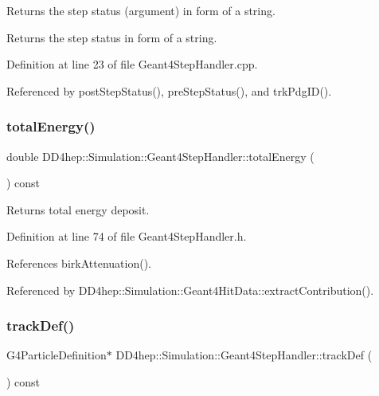 Returns the step status (argument) in form of a string. 

Returns the step status in form of a string. 

Definition at line 23 of file Geant4\+Step\+Handler.\+cpp.



Referenced by post\+Step\+Status(), pre\+Step\+Status(), and trk\+Pdg\+I\+D().

\hypertarget{class_d_d4hep_1_1_simulation_1_1_geant4_step_handler_a1945532b5c538c979b75f598dd1f54d0}{}\label{class_d_d4hep_1_1_simulation_1_1_geant4_step_handler_a1945532b5c538c979b75f598dd1f54d0} 
\subsubsection{\texorpdfstring{total\+Energy()}{totalEnergy()}}
{\footnotesize\ttfamily double D\+D4hep\+::\+Simulation\+::\+Geant4\+Step\+Handler\+::total\+Energy (\begin{DoxyParamCaption}{ }\end{DoxyParamCaption}) const\hspace{0.3cm}{\ttfamily [inline]}}



Returns total energy deposit. 



Definition at line 74 of file Geant4\+Step\+Handler.\+h.



References birk\+Attenuation().



Referenced by D\+D4hep\+::\+Simulation\+::\+Geant4\+Hit\+Data\+::extract\+Contribution().

\hypertarget{class_d_d4hep_1_1_simulation_1_1_geant4_step_handler_a989b3f079f3d153718d381d766bb2a58}{}\label{class_d_d4hep_1_1_simulation_1_1_geant4_step_handler_a989b3f079f3d153718d381d766bb2a58} 
\subsubsection{\texorpdfstring{track\+Def()}{trackDef()}}
{\footnotesize\ttfamily G4\+Particle\+Definition$\ast$ D\+D4hep\+::\+Simulation\+::\+Geant4\+Step\+Handler\+::track\+Def (\begin{DoxyParamCaption}{ }\end{DoxyParamCaption}) const\hspace{0.3cm}{\ttfamily [inline]}}



